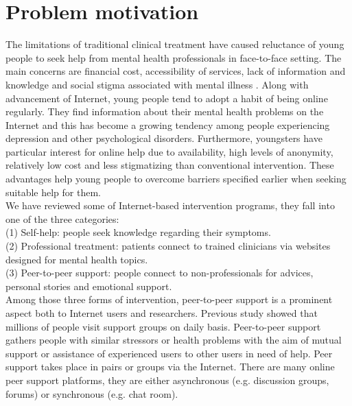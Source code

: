 \section{Problem motivation}
The limitations of traditional clinical treatment have caused reluctance of young people to seek help from mental health professionals in face-to-face setting. The main concerns are financial cost, accessibility of services, lack of information and knowledge and social stigma associated with mental illness \cite{Rickwood2005}. Along with advancement of Internet, young people tend to adopt a habit of being online regularly. They find information about their mental health problems on the Internet and this has become a growing tendency among people experiencing depression and other psychological disorders. Furthermore, youngsters have particular interest for online help due to availability, high levels of anonymity, relatively low cost and less stigmatizing than conventional intervention. These advantages help young people to overcome barriers specified earlier when seeking suitable help for them.\\
We have reviewed some of Internet-based intervention programs, they fall into one of the three categories: \\
(1) Self-help: people seek knowledge regarding their symptoms. \\
(2) Professional treatment: patients connect to trained clinicians via websites designed for mental health topics. \\
(3) Peer-to-peer support: people connect to non-professionals for advices, personal stories and emotional support.\\
Among those three forms of intervention, peer-to-peer support is a prominent aspect both to Internet users and researchers. Previous study showed that millions of people visit support groups on daily basis. Peer-to-peer support gathers people with similar stressors or health problems with the aim of mutual support or assistance of experienced users to other users in need of help. Peer support takes place in pairs or groups via the Internet. There are many online peer support platforms, they are either asynchronous (e.g. discussion groups, forums) or synchronous (e.g. chat room). 





